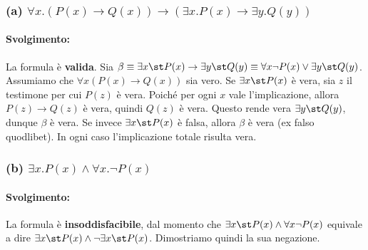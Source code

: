 \subsubsection*{(a) \(\forall x.(P(x)\rightarrow Q(x))\rightarrow(\exists x.P(x)\rightarrow\exists y.Q(y))\)}

\paragraph{Svolgimento:}
La formula è \textbf{valida}. 
Sia \( \beta \equiv \exists x\st P(x)\rightarrow\exists y\st Q(y) \equiv \forall x \neg P(x)\vee\exists y\st Q(y) \).
Assumiamo che \(\forall x(P(x)\rightarrow Q(x))\) sia vero.
Se \(\exists x\st P(x)\) è vera, sia \(z\) il testimone per cui \(P(z)\) è vera. Poiché per ogni \(x\) vale l'implicazione, allora \(P(z)\rightarrow Q(z)\) è vera, quindi \(Q(z)\) è vera. Questo rende vera \(\exists y\st Q(y)\), dunque \(\beta\) è vera.
Se invece \(\exists x\st P(x)\) è falsa, allora \(\beta\) è vera (ex falso quodlibet). In ogni caso l'implicazione totale risulta vera.

\begin{prooftree}
  \small
  
  
  
  
  
\end{prooftree}

\subsubsection*{(b) \(\exists x.P(x)\wedge\forall x.\neg P(x)\)}

\paragraph{Svolgimento:}
La formula è \textbf{insoddisfacibile}, dal momento che \(\exists x\st P(x)\wedge\forall x\neg P(x)\) equivale a dire \(\exists x\st P(x)\wedge\neg\exists x\st P(x)\).
Dimostriamo quindi la sua negazione.

